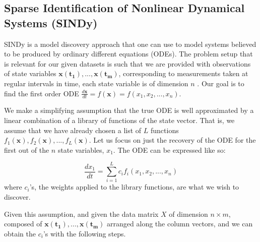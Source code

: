 \documentclass[letterpaper, 10 pt, conference]{ieeeconf}  %
\begin{document}
\subsection{Sparse Identification of Nonlinear Dynamical Systems (SINDy)}
\label{section:sindy}
SINDy \cite{brunton2016sindy} is a model discovery approach that one can use to model systems believed to be produced by ordinary different equations (ODEs). The problem setup that is relevant for our given datasets is such that we are provided with observations of state variables $\bm{x(t_1)}, ... , \bm{x(t_m)}$, corresponding to measurements taken at regular intervals in time, each state variable is of dimension $n$ . Our goal is to find the first order ODE $\frac{d\bm{x}}{dt} = f(\bm{x}) = f(x_1, x_2, ..., x_n)$.

We make a simplifying assumption that the true ODE is well approximated by a linear combination of a library of functions of the state vector. That is, we assume that we have already chosen a list of $L$ functions $f_1(\bm{x}), f_2(\bm{x}), ... ,f_L(\bm{x})$. Let us focus on just the recovery of the ODE for the first out of the $n$ state variables, $x_1$. The ODE can be expressed like so:

\begin{equation}
\frac{dx_1}{dt} = \sum_{i=1}^{L} c_i f_i(x_1, x_2, ..., x_n) 
\label{eq:sindy_library}
\end{equation}
where $c_i$'s, the weights applied to the library functions, are what we wish to discover.

Given this assumption, and given the data matrix $X$ of dimension $n \times m$, composed of $\bm{x(t_1)}, ... , \bm{x(t_m)}$ arranged along the column vectors, and we can obtain the $c_i$'s with the following steps.
\end{document}
